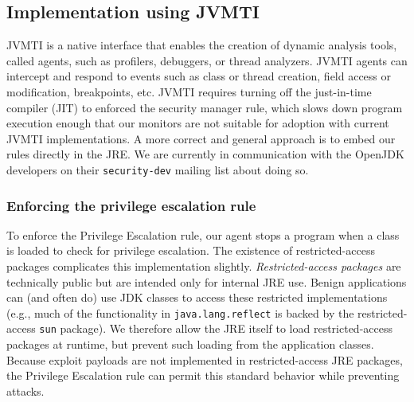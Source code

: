 \documentclass{sig-alternate-05-2015}
\newcommand{\clg}[1]{\todo[color=yellow]{CLG: #1}}
\begin{document}
\subsection{Implementation using JVMTI}\label{sub:Implementation-Using-JVMTI}

JVMTI is a native interface that enables the creation of
dynamic analysis tools, called agents, such as profilers, debuggers, or thread
analyzers. JVMTI agents can intercept and respond to events such as class
or thread creation, field access or modification, breakpoints, etc.
%
JVMTI requires turning off the just-in-time compiler (JIT) to enforced
the security manager rule, which slows down program
execution enough that our monitors are not suitable for adoption with current 
JVMTI implementations. %
A more correct and general approach is to embed our
rules directly in the JRE.  We are currently in communication 
with the OpenJDK developers on their \texttt{security-dev} mailing list about
doing so.

\subsubsection{Enforcing the privilege escalation rule}\label{sub:Enforcing-the-Privilege}


To enforce the Privilege Escalation rule, our agent stops a program when a 
class is loaded to check for privilege escalation.
The existence of restricted-access packages complicates this implementation slightly. 
\textit{Restricted-access packages} are technically public but are intended only
for internal JRE use. 
%
Benign applications can (and often do) use JDK classes to access these
restricted implementations (e.g., much of the functionality in \texttt{java.lang.reflect}
is backed by the restricted-access \texttt{sun} package). %
We therefore allow the JRE itself to load restricted-access packages
at runtime, but prevent such loading from the application classes.
Because exploit payloads are not implemented in restricted-access JRE packages,
the Privilege Escalation rule can permit this standard behavior while preventing
attacks.  
\end{document}
